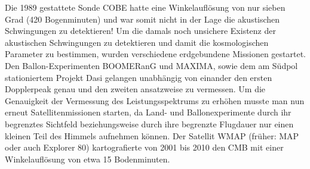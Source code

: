 \documentclass[10pt,a4paper]{article}
\begin{document}
Die 1989 gestattete Sonde COBE hatte eine Winkelauflösung von nur sieben Grad (420 Bogenminuten) und war somit nicht in der Lage die akustischen Schwingungen zu detektieren! Um die damals noch unsichere Existenz der akustischen Schwingungen zu detektieren und damit die kosmologischen Parameter zu bestimmen, wurden verschiedene erdgebundene Missionen gestartet. Den Ballon-Experimenten BOOMERanG und MAXIMA, sowie dem am Südpol stationiertem Projekt Dasi gelangen unabhängig von einander den ersten Dopplerpeak genau und den zweiten ansatzweise zu vermessen. Um die Genauigkeit der Vermessung des Leistungsspektrums zu erhöhen musste man nun erneut Satellitenmissionen starten, da Land- und Ballonexperimente durch ihr begrenztes Sichtfeld beziehungsweise durch ihre begrenzte Flugdauer nur einen kleinen Teil des Himmels aufnehmen können.
Der Satellit WMAP (früher: MAP oder auch Explorer 80) kartografierte von 2001 bis 2010 den CMB mit einer Winkelauflösung von etwa 15 Bodenminuten. 

{}

\end{document}
